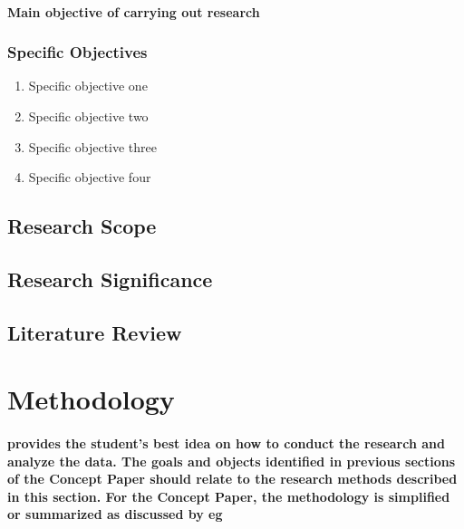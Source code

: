 \documentclass[11pt]{article}
\begin{document}
	   \paragraph{\textmd{Main objective of carrying out  research}}
	   
	   \subsubsection{\textbf{Specific Objectives}}
	   
	   \begin{enumerate}
	   
	   \item Specific objective one
	   \item Specific objective two
	   \item Specific objective three
	   \item Specific objective four
	           
	   \end{enumerate} 
	   \subsection{\textbf{Research Scope}}

	   \subsection{\textbf{Research Significance}}
	   \subsection{\textbf{Literature Review}}
	   
	   \section{\textbf{Methodology}}
	   \paragraph{\textmd{provides the student’s best idea on how to conduct the research and analyze the data. The goals and objects identified in previous sections of the Concept Paper should relate to the research methods described in this section.  For the Concept Paper, the methodology is simplified or summarized as discussed by eg \cite{DUMMY:1}}}
	   
	
    	
    	
    	
\end{document}
